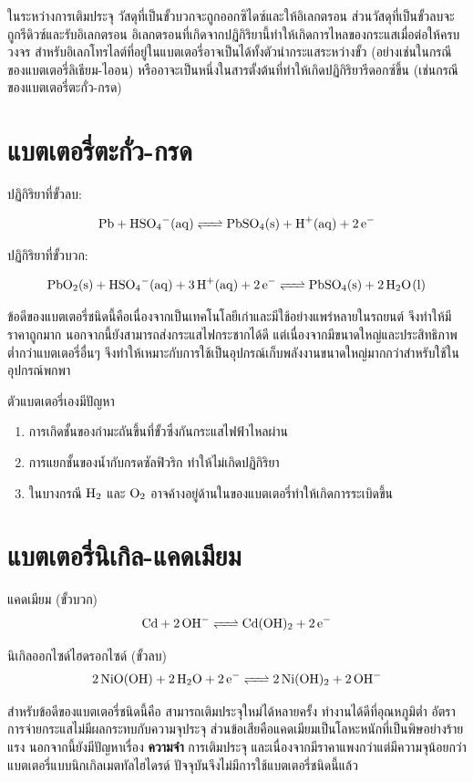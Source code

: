 \documentclass[a4paper,nobib,openany]{tufte-book}
\begin{document}
ในระหว่างการเติมประจุ วัสดุที่เป็นขั้วบวกจะถูกออกซิไดซ์และให้อิเลกตรอน ส่วนวัสดุที่เป็นขั้วลบจะถูกรีดิวซ์และรับอิเลกตรอน อิเลกตรอนที่เกิดจากปฏิกิริยานี้ทำให้เกิดการไหลของกระแสเมื่อต่อให้ครบวงจร สำหรับอิเลกโทรไลต์ที่อยู่ในแบตเตอรี่อาจเป็นได้ทั้งตัวนำกระแสระหว่างขั้ว (อย่างเช่นในกรณีของแบตเตอรี่ลิเธียม-ไออน) หรืออาจะเป็นหนึ่งในสารตั้งต้นที่ทำให้เกิดปฏิกิริยารีดอกซ์ขึ้น (เช่นกรณีของแบตเตอรี่ตะกั่ว-กรด)

\section{แบตเตอรี่ตะกั่ว-กรด}
\label{sec:org2dd5bb6}

ปฏิกิริยาที่ขั้วลบ:

$$ \ce{Pb + HSO4^-(aq) <=> PbSO4(s) + H^+(aq) + 2e^-} $$

ปฏิกิริยาที่ขั้วบวก:

$$ \ce{PbO2(s) + HSO4^-(aq) + 3H^+(aq) + 2e^- <=> PbSO4(s) + 2H2O(l)} $$

ข้อดีของแบตเตอรี่ชนิดนี้คือเนื่องจากเป็นเทคโนโลยีเก่าและมีใช้อย่างแพร่หลายในรถยนต์ จึงทำให้มีราคาถูกมาก นอกจากนี้ยังสามารถส่งกระแสไฟกระชากได้ดี แต่เนื่องจากมีขนาดใหญ่และประสิทธิภาพต่ำกว่าแบตเตอรี่อื่นๆ จึงทำให้เหมาะกับการใช้เป็นอุปกรณ์เก็บพลังงานขนาดใหญ่มากกว่าสำหรับใช้ในอุปกรณ์พกพา

ตัวแบตเตอรี่เองมีปัญหา

\begin{enumerate}
\item การเกิดชั้นของกำมะถันขึ้นที่ขั้วซึ่งกันกระแสไฟฟ้าไหลผ่าน
\item การแยกชั้นของน้ำกับกรดซัลฟิวริก ทำให้ไม่เกิดปฏิกิริยา
\item ในบางกรณี \(\ce{H2}\) และ \(\ce{O2}\) อาจค้างอยู่ด้านในของแบตเตอรี่ทำให้เกิดการระเบิดขึ้น
\end{enumerate}

\section{แบตเตอรี่นิเกิล-แคดเมียม}
\label{sec:org93c46ed}

แคดเมียม (ขั้วบวก)
$$ \ce{Cd + 2OH^- <=> Cd(OH)_2 + 2e^-} $$

นิเกิลออกไซด์ไฮดรอกไซด์ (ขั้วลบ)
$$ \ce{2NiO(OH) + 2H_2O + 2e^- <=> 2Ni(OH)_2 + 2OH^-} $$

สำหรับข้อดีของแบตเตอรี่ชนิดนี้คือ สามารถเติมประจุใหม่ได้หลายครั้ง ทำงานได้ดีที่อุณหภูมิต่ำ อัตราการจ่ายกระแสไม่มีผลกระทบกับความจุประจุ ส่วนข้อเสียคือแคดเมียมเป็นโลหะหนักที่เป็นพิษอย่างร้ายแรง นอกจากนี้ยังมีปัญหาเรื่อง \textbf{ความจำ} การเติมประจุ และเนื่องจากมีราคาแพงกว่าแต่มีความจุน้อยกว่าแบตเตอรี่แบบนิกเกิลเมตทัลไฮไดรด์ ปัจจุบันจึงไม่มีการใช้แบตเตอรี่ชนิดนี้แล้ว
\end{document}
